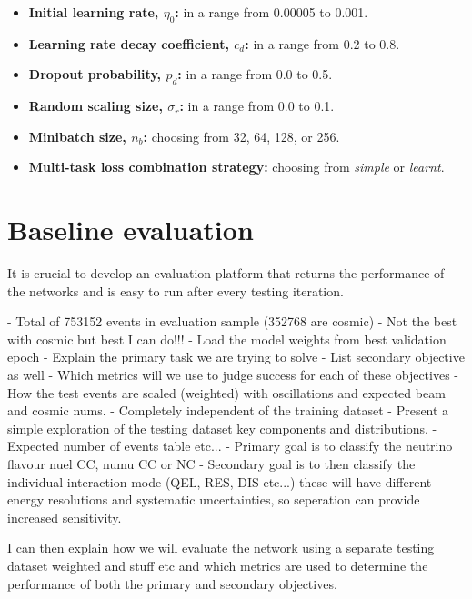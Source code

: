 \begin{itemize}
    \item \textbf{Initial learning rate, $\eta_{0}$:} in a range from 0.00005 to 0.001.
    \item \textbf{Learning rate decay coefficient, $c_{d}$:} in a range from 0.2 to 0.8.
    \item \textbf{Dropout probability, $p_{d}$:} in a range from 0.0 to 0.5.
    \item \textbf{Random scaling size, $\sigma_{r}$:} in a range from 0.0 to 0.1.
    \item \textbf{Minibatch size, $n_{b}$:} choosing from 32, 64, 128, or 256.
    \item \textbf{Multi-task loss combination strategy:} choosing from \emph{simple} or
          \emph{learnt}.
\end{itemize}

\section{Baseline evaluation} %
\label{sec:cvn_baseline_eval} %

It is crucial to develop an evaluation platform that returns the performance of the networks and
is easy to run after every testing iteration.

- Total of 753152 events in evaluation sample (352768 are cosmic)
- Not the best with cosmic but best I can do!!!
- Load the model weights from best validation epoch
- Explain the primary task we are trying to solve
- List secondary objective as well
- Which metrics will we use to judge success for each of these objectives
- How the test events are scaled (weighted) with oscillations and expected beam and cosmic nums.
- Completely independent of the training dataset
- Present a simple exploration of the testing dataset key components and distributions.
- Expected number of events table etc...
- Primary goal is to classify the neutrino flavour nuel CC, numu CC or NC
- Secondary goal is to then classify the individual interaction mode (QEL, RES, DIS etc...) these
will have different energy resolutions and systematic uncertainties, so seperation can provide
increased sensitivity.

I can then explain how we will evaluate the network using a separate testing dataset weighted and
stuff etc and which metrics are used to determine the performance of both the primary and
secondary objectives.

